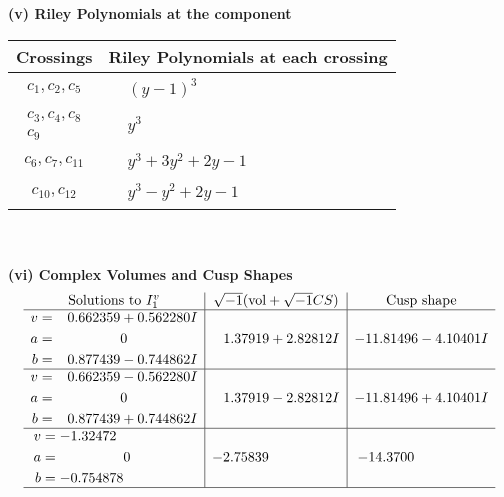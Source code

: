 \documentclass[1p]{elsarticle_modified}
\theoremstyle{definition}
\newcommand{\I}{\sqrt{-1}}
\begin{document}
\newpage\renewcommand{\arraystretch}{1}
\flushleft \textbf{(v) Riley Polynomials at the component}\newline \\
\begin{tabular}{m{50pt}|m{274pt}}
Crossings & \hspace{64pt}Riley Polynomials at each crossing \\
\hline $$\begin{aligned}c_{1},c_{2},c_{5}\end{aligned}$$&$\begin{aligned}
&(y-1)^3
\end{aligned}$\\
\hline $$\begin{aligned}c_{3},c_{4},c_{8}\\c_{9}\end{aligned}$$&$\begin{aligned}
&y^3
\end{aligned}$\\
\hline $$\begin{aligned}c_{6},c_{7},c_{11}\end{aligned}$$&$\begin{aligned}
&y^3+3 y^2+2 y-1
\end{aligned}$\\
\hline $$\begin{aligned}c_{10},c_{12}\end{aligned}$$&$\begin{aligned}
&y^3- y^2+2 y-1
\end{aligned}$\\
\hline
\end{tabular}\\~\\
\newpage\flushleft \textbf{(vi) Complex Volumes and Cusp Shapes}
$$\begin{array}{c|c|c}  
\text{Solutions to }I^v_{1}& \I (\text{vol} + \sqrt{-1}CS) & \text{Cusp shape}\\
 \hline 
\begin{aligned}
v &= \phantom{-}0.662359 + 0.562280 I \\
a &= \phantom{-0.000000 } 0 \\
b &= \phantom{-}0.877439 - 0.744862 I\end{aligned}
 & \phantom{-}1.37919 + 2.82812 I & -11.81496 - 4.10401 I \\ \hline\begin{aligned}
v &= \phantom{-}0.662359 - 0.562280 I \\
a &= \phantom{-0.000000 } 0 \\
b &= \phantom{-}0.877439 + 0.744862 I\end{aligned}
 & \phantom{-}1.37919 - 2.82812 I & -11.81496 + 4.10401 I \\ \hline\begin{aligned}
v &= -1.32472\phantom{ +0.000000I} \\
a &= \phantom{-0.000000 } 0 \\
b &= -0.754878\phantom{ +0.000000I}\end{aligned}
 & -2.75839\phantom{ +0.000000I} & -14.3700\phantom{ +0.000000I}\\
 \hline 
 \end{array}$$\newpage
\end{document}
